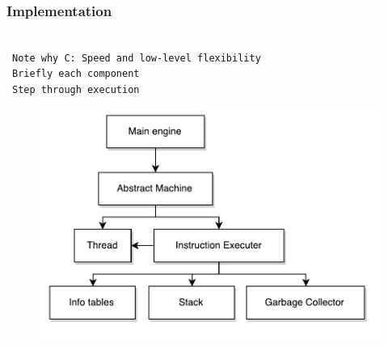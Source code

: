 \documentclass[handout]{beamer}
\newcommand{\n}[1]{\leavevmode\\~\texttt{\color{red}\tiny #1}}
\begin{document}
\begin{frame}
  \frametitle{Implementation}

  \n{Note why C: Speed and low-level flexibility}
  \n{Briefly each component}
  \n{Step through execution}

  \begin{figure}[H]
    \centering
    \includegraphics[scale=0.5]{../figures/arch.pdf}
  \end{figure}
\end{frame}
\end{document}
